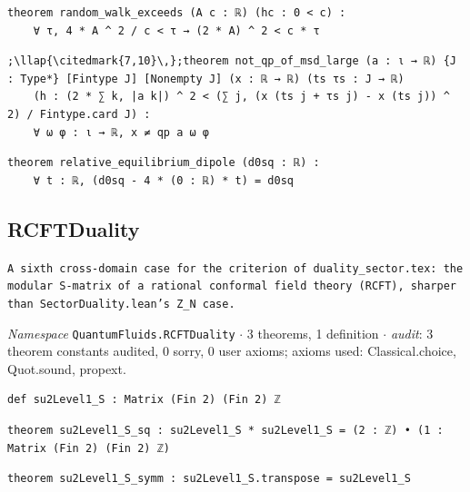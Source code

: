 \begin{lstlisting}[style=leancat]
theorem random_walk_exceeds (A c : ℝ) (hc : 0 < c) :
    ∀ τ, 4 * A ^ 2 / c < τ → (2 * A) ^ 2 < c * τ
\end{lstlisting}

\begin{lstlisting}[style=leancat]
;\llap{\citedmark{7,10}\,};theorem not_qp_of_msd_large (a : ι → ℝ) {J : Type*} [Fintype J] [Nonempty J] (x : ℝ → ℝ) (ts τs : J → ℝ)
    (h : (2 * ∑ k, |a k|) ^ 2 < (∑ j, (x (ts j + τs j) - x (ts j)) ^ 2) / Fintype.card J) :
    ∀ ω φ : ι → ℝ, x ≠ qp a ω φ
\end{lstlisting}

\begin{lstlisting}[style=leancat]
theorem relative_equilibrium_dipole (d0sq : ℝ) :
    ∀ t : ℝ, (d0sq - 4 * (0 : ℝ) * t) = d0sq
\end{lstlisting}

\subsection{RCFTDuality}\label{appA:RCFTDuality}
{\footnotesize\raggedright\texttt{A sixth cross-\allowbreak{}domain case for the criterion of duality\_\allowbreak{}sector.\allowbreak{}tex: the modular S-\allowbreak{}matrix of a rational conformal field theory (RCFT),\allowbreak{} sharper than SectorDuality.\allowbreak{}lean's Z\_\allowbreak{}N case.\allowbreak{}}\par}
{\footnotesize\raggedright\emph{Namespace} \texttt{QuantumFluids.\allowbreak{}RCFTDuality} $\cdot$ 3 theorems, 1 definition $\cdot$ \emph{audit}: 3 theorem constants audited, 0 sorry, 0 user axioms; axioms used: Classical.choice, Quot.sound, propext.\par}
\vspace{1pt}
\begin{lstlisting}[style=leancat]
def su2Level1_S : Matrix (Fin 2) (Fin 2) ℤ
\end{lstlisting}

\begin{lstlisting}[style=leancat]
theorem su2Level1_S_sq : su2Level1_S * su2Level1_S = (2 : ℤ) • (1 : Matrix (Fin 2) (Fin 2) ℤ)
\end{lstlisting}

\begin{lstlisting}[style=leancat]
theorem su2Level1_S_symm : su2Level1_S.transpose = su2Level1_S
\end{lstlisting}

